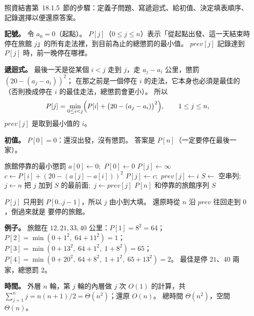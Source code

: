 \begin{pastsoln}
照資結書第~18.1.5~節的步驟：定義子問題、寫遞迴式、給初值、決定填表順序、記錄選擇以便還原答案。

\textbf{記號。} 令 $a_0 = 0$（起點）。 $P[j]$（$0 \le j \le n$）表示「從起點出發、這一天結束時停在旅館
$j$」的所有走法裡，到目前為止的總懲罰的最小值。 $\mathit{prev}[j]$ 記錄達到 $P[j]$ 時，前一晚停在哪裡。

\textbf{遞迴式。} 最後一天是從某個 $i < j$ 走到 $j$，走 $a_j - a_i$ 公里，懲罰 $(20 - (a_j - a_i))^2$；
在那之前是一個停在 $i$ 的走法，它本身也必須是最佳的（否則換成停在 $i$ 的最佳走法，總懲罰會更小）。 所以
\[
P[j] = \min_{0 \le i < j} \Bigl( P[i] + \bigl(20 - (a_j - a_i)\bigr)^2 \Bigr), \qquad 1 \le j \le n,
\]
$\mathit{prev}[j]$ 是取到最小值的 $i$。

\textbf{初值。} $P[0] = 0$：還沒出發，沒有懲罰。 答案是 $P[n]$（一定要停在最後一家）。

\begin{pseudo}{旅館停靠的最小懲罰}
 
    \State $a[0] \gets 0$;\ $P[0] \gets 0$
        \State $P[j] \gets \infty$
            \State $c \gets P[i] + (20 - (a[j] - a[i]))^2$
                \State $P[j] \gets c$;\ $\mathit{prev}[j] \gets i$
            \EndIf
        \EndFor
    \EndFor
    \State $S \gets$ 空串列;\ $j \gets n$
        \State 把 $j$ 加到 $S$ 的最前面;\ $j \gets \mathit{prev}[j]$
    \EndWhile
    \State \Return $P[n]$ 和停靠的旅館序列 $S$
\EndFunction
\end{pseudo}

$P[j]$ 只用到 $P[0..j-1]$，所以 $j$ 由小到大填。 還原時從 $n$ 沿 $\mathit{prev}$ 往回走到 $0$，倒過來就是
要停的旅館。

\textbf{例子。} 旅館在 $12, 21, 33, 40$ 公里：$P[1] = 8^2 = 64$；$P[2] = \min(0 + 1^2,\; 64 + 11^2) = 1$；
$P[3] = \min(0 + 13^2,\; 64 + 1^2,\; 1 + 8^2) = 65$；$P[4] = \min(0 + 20^2,\; 64 + 8^2,\; 1 + 1^2,\;
65 + 13^2) = 2$。 最佳是停 $21$、$40$ 兩家，總懲罰 $2$。

\textbf{時間。} 外層 $n$ 輪，第 $j$ 輪的內層做 $j$ 次 $O(1)$ 的計算，共
$\sum_{j=1}^{n} j = n(n+1)/2 = \Theta(n^2)$；還原 $O(n)$。 總時間 $\Theta(n^2)$，空間 $\Theta(n)$。
\end{pastsoln}
